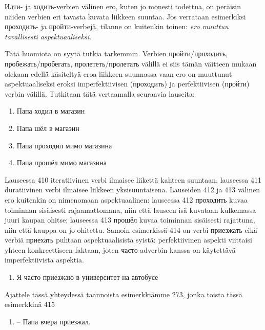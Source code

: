 \documentclass[]{scrreprt}
\providecommand{\tightlist}{%
  \setlength{\itemsep}{0pt}\setlength{\parskip}{0pt}}
\begin{document}
Идти- ja ходить-verbien välinen ero, kuten jo monesti todettua, on
peräisin näiden verbien eri tavasta kuvata liikkeen suuntaa. Jos
verrataan esimerkiksi проходить- ja пройти-verbejä, tilanne on kuitenkin
toinen: \emph{ero muuttuu tavallisesti aspektuaaliseksi}.

Tätä huomiota on syytä tutkia tarkemmin. Verbien пройти/проходить,
пробежать/пробегать, пролететь/пролетать välillä ei siis tämän väitteen
mukaan olekaan edellä käsiteltyä eroa liikkeen suunnassa vaan ero on
muuttunut aspektuaaliseksi eroksi imperfektiivisen (проходить) ja
perfektiivisen (пройти) verbin välillä. Tutkitaan tätä vertaamalla
seuraavia lauseita:

\begin{enumerate}
\def\labelenumi{(\arabic{enumi})}
\setcounter{enumi}{409}
\tightlist
\item
  Папа ходил в магазин
\item
  Папа шёл в магазин
\item
  Папа проходил мимо магазина
\item
  Папа прошёл мимо магазина
\end{enumerate}

Lauseessa 410 iteratiivinen verbi ilmaisee liikettä kahteen suuntaan,
lauseessa 411 duratiivinen verbi ilmaisee liikkeen yksisuuntaisena.
Lauseiden 412 ja 413 välinen ero kuitenkin on nimenomaan aspektuaalinen:
lauseessa 412 проходить kuvaa toiminnan sisäisesti rajaamattomana, niin
että lauseen isä kuvataan kulkemassa juuri kaupan ohitse; lauseessa 413
прошёл kuvaa toiminnan sisäisesti rajattuna, niin että kauppa on jo
ohitettu. Samoin esimerkissä 414 on verbi приезжать eikä verbiä приехать
puhtaan aspektuaalisista syistä: perfektiivinen aspekti viittaisi yhteen
konkreettiseen faktaan, joten часто-adverbin kanssa on käytettävä
imperfektiivista aspektia.

\begin{enumerate}
\def\labelenumi{(\arabic{enumi})}
\setcounter{enumi}{413}
\tightlist
\item
  Я часто приезжаю в университет на автобусе
\end{enumerate}

Ajattele tässä yhteydessä taannoista esimerkkiämme 273, jonka toista
tässä esimerkkinä 415

\begin{enumerate}
\def\labelenumi{(\arabic{enumi})}
\setcounter{enumi}{414}
\tightlist
\item
  -- Папа вчера приезжал.
\end{enumerate}
\end{document}
